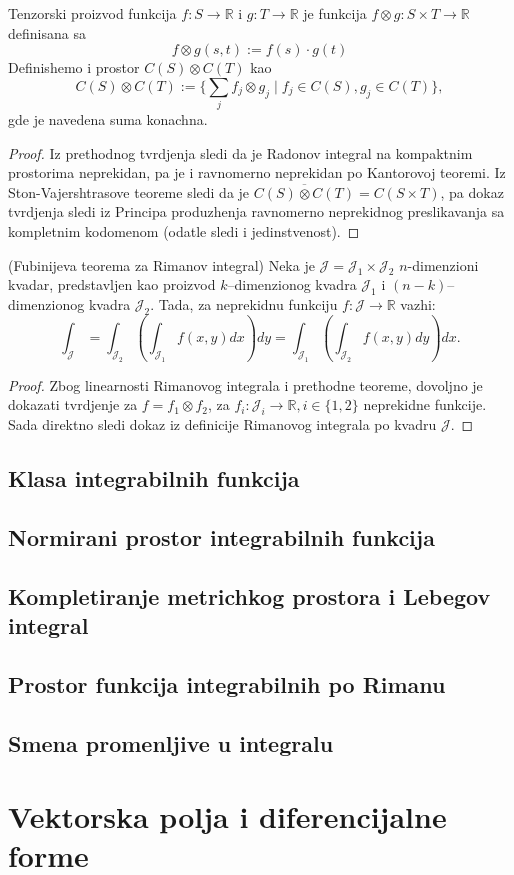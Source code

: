 \documentclass[a4paper,12pt]{article}
\newcommand{\RR}{\mathbb{R}}
\begin{document}
\begin{nap}
	Tenzorski proizvod funkcija $f:S\to \RR$ i $g:T\to \RR$ je funkcija $f\otimes g:S\times T \to \RR$
	definisana sa 
	\[ f\otimes g(s, t) := f(s)\cdot g(t) \] 
	Definishemo i prostor $C(S)\otimes C(T)$ kao
	\[ C(S)\otimes C(T) := \Big\{\sum_j f_j\otimes g_j\mid f_j \in C(S), g_j \in C(T)\Big\},\] 
	gde je navedena suma konachna.
\end{nap}
\begin{proof}
	Iz prethodnog tvrdjenja sledi da je Radonov integral na kompaktnim prostorima neprekidan,
	pa je i ravnomerno neprekidan po Kantorovoj teoremi. Iz Ston-Vajershtrasove teoreme sledi
	da je $\overline{C(S)\otimes C(T)} = C(S\times T)$, pa dokaz tvrdjenja sledi iz Principa
	produzhenja ravnomerno neprekidnog preslikavanja sa kompletnim kodomenom (odatle 
	sledi i jedinstvenost).
\end{proof}

\begin{posl}(Fubinijeva teorema za Rimanov integral)
	Neka je $\mathcal{J} = \mathcal{J}_1 \times \mathcal{J}_2$ $n$-dimenzioni kvadar,
	predstavljen kao proizvod $k$--dimenzionog kvadra $\mathcal J_1$ i $(n-k)$--dimenzionog kvadra $\mathcal J_2$.
	Tada, za neprekidnu funkciju $f:\mathcal{J}\to \RR$ vazhi:
	\[ \int_{\mathcal J} = \int_{\mathcal J_2} \left(\int_{\mathcal J_1}f(x, y) dx \right) dy = \int_{\mathcal J_1} \left(\int_{\mathcal J_2}f(x, y) dy \right) dx.\] 
\end{posl}
\begin{proof}
	Zbog linearnosti Rimanovog integrala i prethodne teoreme, dovoljno je dokazati tvrdjenje
	za $f = f_1 \otimes f_2$, za $f_i:\mathcal J_i \to \RR, i \in \{1, 2\}$ neprekidne funkcije.
	Sada direktno sledi dokaz iz definicije Rimanovog integrala po kvadru $\mathcal J$.
\end{proof}

\subsection{Klasa integrabilnih funkcija}

\subsection{Normirani prostor integrabilnih funkcija}

\subsection{Kompletiranje metrichkog prostora i Lebegov integral}

\subsection{Prostor funkcija integrabilnih po Rimanu}

\subsection{Smena promenljive u integralu}

\section{Vektorska polja i diferencijalne forme}
\end{document}
